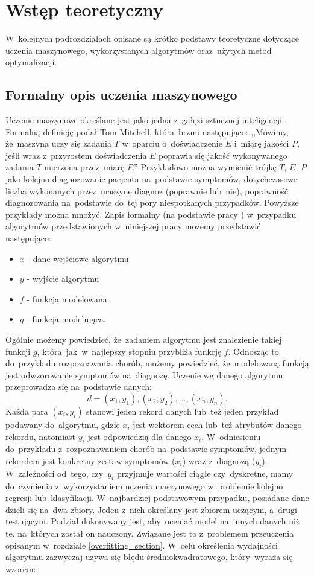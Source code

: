 \section{Wstęp teoretyczny} \label{theory}
W~kolejnych podrozdziałach opisane są krótko podstawy teoretyczne dotyczące uczenia maszynowego, wykorzystanych algorytmów oraz~użytych metod optymalizacji.
\subsection{Formalny opis uczenia maszynowego}
Uczenie maszynowe określane jest jako jedna z~gałęzi sztucznej inteligencji \cite{dnn1}. Formalną definicję podał Tom Mitchell, która~brzmi następująco: ,,Mówimy, że~maszyna uczy się zadania $T$ w~oparciu o~doświadczenie $E$ i~miarę jakości $P$, jeśli wraz z~przyrostem doświadczenia $E$ poprawia się jakość wykonywanego zadania $T$ mierzona przez~miarę $P$.''\cite{mitchel} Przykładowo można wymienić trójkę $T$, $E$, $P$ jako kolejno diagnozowanie pacjenta na~podstawie symptomów, dotychczasowe  liczba wykonanych przez~maszynę diagnoz (poprawnie lub~nie),  poprawność diagnozowania na~podstawie do~tej pory niespotkanych przypadków. Powyższe przykłady można mnożyć. Zapis formalny (na podstawie pracy \cite{formal2}) w~przypadku algorytmów przedstawionych w~niniejszej pracy możemy przedstawić następująco:
\begin{itemize}
\item $x$ - dane wejściowe algorytmu
\item $y$ - wyjście algorytmu
\item $f$ - funkcja modelowana
\item $g$ - funkcja modelująca.
\end{itemize}
Ogólnie możemy powiedzieć, że~zadaniem algorytmu jest znalezienie takiej funkcji $g$, która~jak~w~najlepszy stopniu przybliża funkcję $f$. Odnosząc to do~przykładu rozpoznawania chorób, możemy powiedzieć, że~modelowaną funkcją jest odwzorowanie symptomów na~diagnozę. Uczenie wg danego algorytmu przeprowadza się na~podstawie danych:
\begin{equation}
d = (x_1,y_1), (x_2, y_2), ..., (x_n, y_n).
\end{equation}
Każda para $(x_i, y_i)$ stanowi jeden rekord danych lub~też jeden przykład podawany do~algorytmu, gdzie $x_i$ jest wektorem cech lub~też atrybutów danego rekordu, natomiast $y_i$ jest odpowiedzią dla danego $x_i$. W~odniesieniu do~przykładu z~rozpoznawaniem chorób na~podstawie symptomów, jednym rekordem jest konkretny zestaw symptomów ($x_i$) wraz z~diagnozą ($y_i$). W~zależności od~tego, czy~$y_i$ przyjmuje wartości ciągłe czy~dyskretne, mamy do~czynienia z~wykorzystaniem uczenia maszynowego w~problemie kolejno regresji lub~klasyfikacji. W~najbardziej podstawowym przypadku, posiadane dane dzieli się na~dwa zbiory. Jeden z~nich określany jest zbiorem uczącym, a~drugi testującym. Podział dokonywany jest, aby~oceniać model na~innych danych niż te, na~których został on nauczony. Związane jest to z~problemem przeuczenia opisanym w~rozdziale \ref{overfitting_section}. W~celu określenia wydajności algorytmu zazwyczaj używa się błędu średniokwadratowego, który~wyraża się wzorem:
